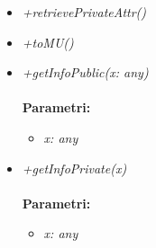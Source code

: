 \begin{itemize}
\begin{itemize}
    		\item \emph{+retrievePrivateAttr()}\\
    		
    		\item \emph{+toMU()}\\
    		
    		\item \emph{+getInfoPublic(x: any)}\\
    		\\
    		\textbf{Parametri:}
    		\begin{itemize}
    			\item \emph{x: any}\\
    			
    		\end{itemize}
    		\item \emph{+getInfoPrivate(x)}\\
    		\\
    		\textbf{Parametri:}
    		\begin{itemize}
    			\item \emph{x: any}\\
    			
    		\end{itemize}
    	\end{itemize}
\end{itemize}